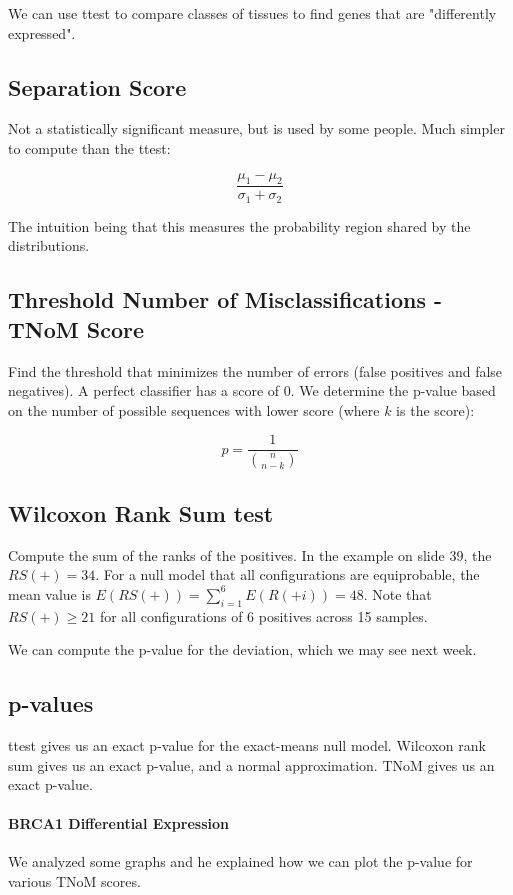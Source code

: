 \documentclass[a4paper]{article}
\begin{document}
We can use ttest to compare classes of tissues to find genes that are "differently expressed".

\subsection{Separation Score}
Not a statistically significant measure, but is used by some people. Much simpler to compute than the ttest:

\[\frac{\mu_1 - \mu_2}{\sigma_1 + \sigma_2}\]

The intuition being that this measures the probability region shared by the distributions.

\subsection{Threshold Number of Misclassifications - TNoM Score}
Find the threshold that minimizes the number of errors (false positives and false negatives). A perfect classifier has a score of 0. We determine the p-value based on the number of possible sequences with lower score (where $k$ is the score):

\[p=\frac{1}{\binom{n}{n-k}}\]

\subsection{Wilcoxon Rank Sum test}
Compute the sum of the ranks of the positives. In the example on slide 39, the $RS(+)=34$. For a null model that all configurations are equiprobable, the mean value is $E(RS(+))=\sum_{i=1}^6 E(R(+i))=48$. Note that $RS(+)\ge 21$ for all configurations of 6 positives across 15 samples.

We can compute the p-value for the deviation, which we may see next week.

\subsection{p-values}
ttest gives us an exact p-value for the exact-means null model.
Wilcoxon rank sum gives us an exact p-value, and a normal approximation.
TNoM gives us an exact p-value.

\paragraph{BRCA1 Differential Expression}
We analyzed some graphs and he explained how we can plot the p-value for various TNoM scores.
\end{document}
